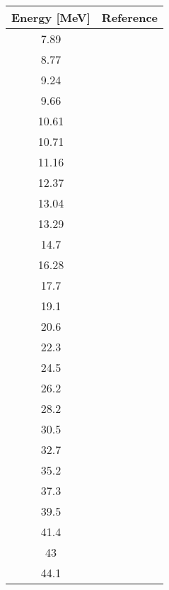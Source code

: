 \begin{tabular}{c c} 
    \toprule
    \bf{Energy [MeV]} & \bf{Reference} \\
    \midrule
    7.89 & \cite{Stevens1966}\\
    8.77 & \cite{Stevens1966}\\
    9.24 & \cite{Stevens1966}\\
    9.66 & \cite{Stevens1966}\\
    10.61 & \cite{Stevens1966}\\
    10.71 & \cite{Stevens1966}\\
    11.16 & \cite{Stevens1966}\\
    12.37 & \cite{Stevens1966}\\
    13.04 & \cite{Stevens1966}\\
    13.29 & \cite{Stevens1966}\\
    14.7 & \cite{Fabrici80}\\
    16.28 & \cite{Stevens1966}\\
    17.7 & \cite{Fabrici80}\\
    19.1 & \cite{Fabrici80}\\
    20.6 & \cite{Fabrici80}\\
    22.3 & \cite{Fabrici80}\\
    24.5 & \cite{Fabrici80}\\
    26.2 & \cite{Fabrici80}\\
    28.2 & \cite{Fabrici80}\\
    30.5 & \cite{Fabrici80}\\
    32.7 & \cite{Fabrici80}\\
    35.2 & \cite{Colomb77}\\
    37.3 & \cite{Fabrici80}\\
    39.5 & \cite{Fabrici80}\\
    41.4 & \cite{Fabrici80}\\
    43 & \cite{Khan2000}\\
    44.1 & \cite{Fabrici80}\\
    \bottomrule
\end{tabular}
